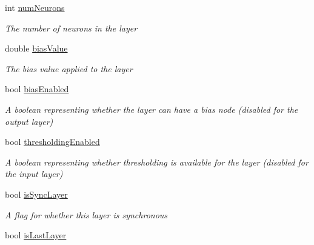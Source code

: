 \begin{DoxyCompactItemize}
\item 
int \hyperlink{class_n_n_gen_1_1_layer_setup_ad02db2fa93e561ffd181ad7824d6b296}{num\+Neurons}
\begin{DoxyCompactList}\small\item\em The number of neurons in the layer \end{DoxyCompactList}\item 
double \hyperlink{class_n_n_gen_1_1_layer_setup_a44fec12782544a7b0ec9f9705251ebaf}{bias\+Value}
\begin{DoxyCompactList}\small\item\em The bias value applied to the layer \end{DoxyCompactList}\item 
bool \hyperlink{class_n_n_gen_1_1_layer_setup_aba1fd67f0b1f840794b46dcd3626e05f}{bias\+Enabled}
\begin{DoxyCompactList}\small\item\em A boolean representing whether the layer can have a bias node (disabled for the output layer) \end{DoxyCompactList}\item 
bool \hyperlink{class_n_n_gen_1_1_layer_setup_a8b5e8dd32a59d8ebb4956e3ddb6220b8}{thresholding\+Enabled}
\begin{DoxyCompactList}\small\item\em A boolean representing whether thresholding is available for the layer (disabled for the input layer) \end{DoxyCompactList}\item 
bool \hyperlink{class_n_n_gen_1_1_layer_setup_a3c8d928b37fc46a8098bb9698dbd622c}{is\+Sync\+Layer}
\begin{DoxyCompactList}\small\item\em A flag for whether this layer is synchronous \end{DoxyCompactList}\item 
bool \hyperlink{class_n_n_gen_1_1_layer_setup_a7c89db95e04b0f4b046786ba56b97b76}{is\+Last\+Layer}

\end{DoxyCompactItemize}
